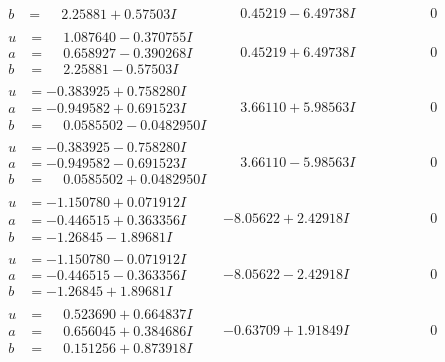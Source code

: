 \documentclass[1p]{elsarticle_modified}
\theoremstyle{definition}
\begin{document}
$$\begin{array}{c|c|c}
\begin{aligned}
b &= \phantom{-}2.25881 + 0.57503 I\end{aligned}
 & \phantom{-}0.45219 - 6.49738 I & \phantom{-0.000000 } 0 \\ \hline\begin{aligned}
u &= \phantom{-}1.087640 - 0.370755 I \\
a &= \phantom{-}0.658927 - 0.390268 I \\
b &= \phantom{-}2.25881 - 0.57503 I\end{aligned}
 & \phantom{-}0.45219 + 6.49738 I & \phantom{-0.000000 } 0 \\ \hline\begin{aligned}
u &= -0.383925 + 0.758280 I \\
a &= -0.949582 + 0.691523 I \\
b &= \phantom{-}0.0585502 - 0.0482950 I\end{aligned}
 & \phantom{-}3.66110 + 5.98563 I & \phantom{-0.000000 } 0 \\ \hline\begin{aligned}
u &= -0.383925 - 0.758280 I \\
a &= -0.949582 - 0.691523 I \\
b &= \phantom{-}0.0585502 + 0.0482950 I\end{aligned}
 & \phantom{-}3.66110 - 5.98563 I & \phantom{-0.000000 } 0 \\ \hline\begin{aligned}
u &= -1.150780 + 0.071912 I \\
a &= -0.446515 + 0.363356 I \\
b &= -1.26845 - 1.89681 I\end{aligned}
 & -8.05622 + 2.42918 I & \phantom{-0.000000 } 0 \\ \hline\begin{aligned}
u &= -1.150780 - 0.071912 I \\
a &= -0.446515 - 0.363356 I \\
b &= -1.26845 + 1.89681 I\end{aligned}
 & -8.05622 - 2.42918 I & \phantom{-0.000000 } 0 \\ \hline\begin{aligned}
u &= \phantom{-}0.523690 + 0.664837 I \\
a &= \phantom{-}0.656045 + 0.384686 I \\
b &= \phantom{-}0.151256 + 0.873918 I\end{aligned}
 & -0.63709 + 1.91849 I & \phantom{-0.000000 } 0 \\ \hline\begin{aligned}

\end{aligned}
\end{array}$$
\end{document}
